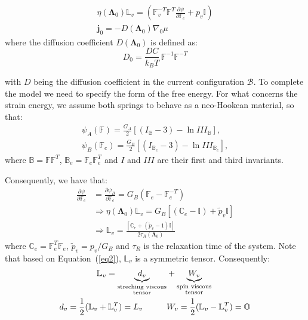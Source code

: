 \documentclass[12pt]{extarticle}
\newcommand{\F}{\ensuremath{\mathbb{F}}}
\newcommand{\B}{\ensuremath{\mathbb{B}}}
\newcommand{\LL}{\ensuremath{\mathbb{L}}}
\begin{document}
\begin{eqnarray}
\eta(\boldsymbol{\Lambda}_0)\LL_v= \left(\F_v^{-T}\F^{T} \frac{\partial \psi}{\partial \F_e}+p_v\mathbb{I}\right)\\
\mathbf{j}_0 = -D(\boldsymbol{\Lambda}_0) \nabla_0 \mu
\end{eqnarray}
where the diffusion coefficient $D(\boldsymbol{\Lambda}_0)$ is defined as:
\begin{equation}
D_0= \frac{DC}{k_BT}\, \F^{-1}\F^{-T}
\end{equation}

with $D$ being the diffusion coefficient in the current configuration $\mathcal{B}$.
To complete the model we need to specify the form of the free energy. For what concerns the strain energy, we assume both springs to behave as a neo-Hookean material, so that:
\begin{equation}
\begin{aligned}
\psi_A(\F) = \frac{G_A}{2} \left[(I_\B-3)-\ln III_\B\right],\\
\psi_B(\F_e) = \frac{G_B}{2} \left[(I_{\B_e}-3)-\ln III_{\B_e}\right],
\end{aligned}
\end{equation}
where $\B=\F\F^T$, $\B_e=\F_e\F_e^T$ and $I$ and $III$ are their first and third invariants.

Consequently, we have that:
\begin{equation}
\begin{aligned}
\frac{\partial \psi}{\partial \F_e}&=\frac{\partial \psi_B}{\partial \F_e}= G_B (\F_e-\F_e^{-T})\\%
&\Longrightarrow
\eta(\boldsymbol{\Lambda}_0)\LL_v=G_B \left[\left(\mathbb{C}_e-\mathbb{I}\right)+\tilde{p}_v\mathbb{I}\right]\\
&\Longrightarrow \LL_v= \frac{\left[\mathbb{C}_e+(\tilde{p}_v-1)\mathbb{I}\right]}{ 2\tau_R(\boldsymbol{\Lambda}_0)}
\end{aligned}
\label{eq2}
\end{equation} 
where $\mathbb{C}_e=\F_e^T\F_e$, $\tilde{p}_v=p_v/G_B$ and $\tau_R$ is the relaxation time of the system. Note that based on Equation~(\ref{eq2}), $\LL_v$ is a symmetric tensor. Consequently:
\begin{equation}
\begin{aligned}
\LL_v = \underbrace{d_v}_{\substack{\text{streching viscous} \\ \text{tensor}}}& +\underbrace{W_v}_{\substack{\text{spin viscous} \\ \text{tensor}}} \\
d_v=\frac{1}{2} (\LL_v+\LL_v^T)=L_v\hspace{10mm}& W_v=\frac{1}{2} (\LL_v-\LL_v^T)= \mathbb{O}
\end{aligned}
\end{equation}
\end{document}
